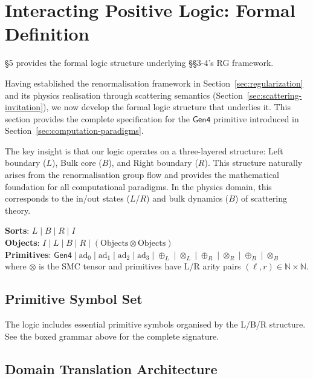 \section{Interacting Positive Logic: Formal Definition}
\label{sec:formal-systems}

§5 provides the formal logic structure underlying §§3-4's RG framework.

Having established the renormalisation framework in Section~\ref{sec:regularization} and its physics realisation through scattering semantics (Section~\ref{sec:scattering-invitation}), we now develop the formal logic structure that underlies it. This section provides the complete specification for the $\mathsf{Gen4}$ primitive introduced in Section~\ref{sec:computation-paradigms}.

The key insight is that our logic operates on a three-layered structure: Left boundary ($L$), Bulk core ($B$), and Right boundary ($R$). This structure naturally arises from the renormalisation group flow and provides the mathematical foundation for all computational paradigms. In the physics domain, this corresponds to the in/out states ($L$/$R$) and bulk dynamics ($B$) of scattering theory.

\begin{notation}
\label{not:logic-signature}
\textbf{Sorts}: $L \mid B \mid R \mid I$ \\
\textbf{Objects}: $I \mid L \mid B \mid R \mid (\text{Objects} \otimes \text{Objects})$ \\
\textbf{Primitives}: $\mathsf{Gen4} \mid \text{ad}_0 \mid \text{ad}_1 \mid \text{ad}_2 \mid \text{ad}_3 \mid \oplus_L \mid \otimes_L \mid \oplus_R \mid \otimes_R \mid \oplus_B \mid \otimes_B$ \\
where $\otimes$ is the SMC tensor and primitives have L/R arity pairs $(\ell,r) \in \mathbb{N} \times \mathbb{N}$.
\end{notation}

\subsection{Primitive Symbol Set}

The logic includes essential primitive symbols organised by the L/B/R structure. See the boxed grammar above for the complete signature.

\subsection{Domain Translation Architecture}

